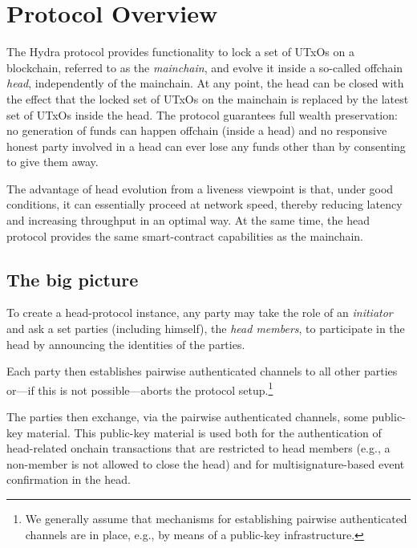 \section{Protocol Overview}\label{sec:overview}


The Hydra protocol provides functionality to lock a set of UTxOs on a
blockchain, referred to as the \emph{mainchain}, and evolve it inside a
so-called offchain \emph{head}, independently of the mainchain. At any point,
the head can be closed with the effect that the locked set of UTxOs on the
mainchain is replaced by the latest set of UTxOs inside the head. The protocol
guarantees full wealth preservation: no generation of funds can happen offchain
(inside a head) and no responsive honest party involved in a head can ever lose
any funds other than by consenting to give them away.

The advantage of head evolution from a liveness viewpoint is that, under good
conditions, it can essentially proceed at network speed, thereby reducing
latency and increasing throughput in an optimal way. At the same time, the head
protocol provides the same smart-contract capabilities as the mainchain.

\subsection{The big picture}\label{sec:overview_bp}

To create a head-protocol instance, any party may take the role of an
\emph{initiator} and ask a set parties (including himself),
the \emph{head members}, to participate in the head by announcing the
identities of the parties.

Each party then establishes pairwise authenticated channels to all other parties
or---if this is not possible---aborts the protocol setup.\footnote{We generally
  assume that mechanisms for establishing pairwise authenticated channels are in
  place, e.g., by means of a public-key infrastructure.}

The parties then exchange, via the pairwise authenticated channels,
some public-key material. This public-key material is used both
for the authentication of head-related onchain transactions that
are restricted to head members (e.g., a non-member is not allowed
to close the head) and for multisignature-based event confirmation
in the head.


